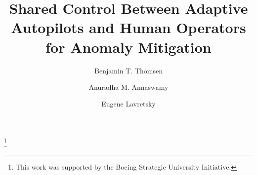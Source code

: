 \documentclass[english]{ifacconf}
\begin{document}
\begin{frontmatter}
	
\title{Shared Control Between Adaptive Autopilots and Human Operators for Anomaly Mitigation}

\thanks[footnoteinfo]{This work was supported by the Boeing Strategic University Initiative.}

\author[MIT]{Benjamin T. Thomsen} 
\author[MIT]{Anuradha M. Annaswamy} 
\author[Boeing]{Eugene Lavretsky} 

\address[MIT]{Massachusetts Institute of Technology, 
   Cambridge, MA 02139}%
\address[Boeing]{The Boeing Company, 
   Huntington Beach, CA 92647}

\begin{abstract}

\end{abstract}
\end{frontmatter}
\end{document}
